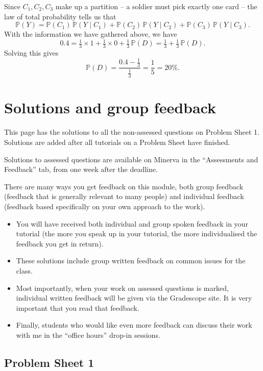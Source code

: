 \documentclass[
  a4paper,
]{book}
\newif\ifcomm\commtrue
\theoremstyle{definition}
\theoremstyle{definition}
\theoremstyle{definition}
\theoremstyle{definition}
\theoremstyle{remark}
\begin{document}
Since \(C_1, C_2, C_3\) make up a partition -- a soldier must pick exactly one card -- the law of total probability tells us that
\[ \mathbb P(Y) = \mathbb P(C_1)\,\mathbb P(Y \mid C_1) + \mathbb P(C_2)\,\mathbb P(Y \mid C_2) + 
\mathbb P(C_3)\,\mathbb P(Y \mid C_3) .\]
With the information we have gathered above, we have
\[ 0.4 = \tfrac13 \times 1 + \tfrac13 \times 0 + \tfrac13 \, \mathbb P(D) = \tfrac13 + \tfrac13 \,\mathbb P(D)  . \]
Solving this gives
\[ \mathbb P(D) = \frac{0.4 - \frac13}{\frac13} = \frac15 = 20\% . \]

\commtrue

\hypertarget{solutions}{%
\chapter*{Solutions and group feedback}\label{solutions}}

This page has the solutions to all the non-assessed questions on Problem Sheet 1. Solutions are added after all tutorials on a Problem Sheet have finished.

Solutions to assessed questions are available on Minerva in the ``Assessments and Feedback'' tab, from one week after the deadline.

There are many ways you get feedback on this module, both group feedback (feedback that is generally relevant to many people) and individual feedback (feedback based specifically on your own approach to the work).

\begin{itemize}
\item
  You will have received both individual and group spoken feedback in your tutorial (the more you speak up in your tutorial, the more individualised the feedback you get in return).
\item
  These solutions include group written feedback on common issues for the class.
\item
  Most importantly, when your work on assessed questions is marked, individual written feedback will be given via the Gradescope site. It is very important that you read that feedback.
\item
  Finally, students who would like even more feedback can discuss their work with me in the ``office hours'' drop-in sessions.
\end{itemize}

\hypertarget{P1-solutions}{%
\section*{Problem Sheet 1}\label{P1-solutions}}
\end{document}
